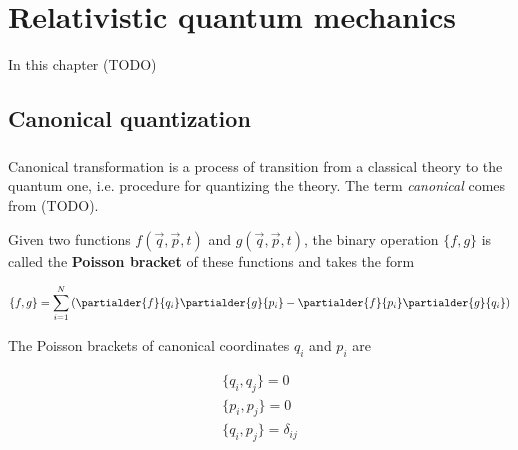\chapter{Relativistic quantum mechanics}

In this chapter (TODO)

\section{Canonical quantization}

\paragraph{} Canonical transformation is a process of transition from a classical theory to
the quantum one, i.e. procedure for quantizing the theory. The term \textit{canonical} comes
from (TODO).

\begin{definition}
    \label{df:poisson}
    Given two functions $f(\vec{q}, \vec{p}, t)$ and $g(\vec{q}, \vec{p}, t)$, the binary operation
    $\{f, g\}$ is called the \textbf{Poisson bracket} of these functions and takes the form

    \begin{equation}
        \{f, g\} = \sum_{i=1}^{N}\left(\partialder{f}{q_{i}} \partialder{g}{p_{i}} - \partialder{f}{p_{i}} \partialder{g}{q_{i}}\right)
    \end{equation}
\end{definition}

\begin{theorem}
    \label{th:poisson_cononical_coordinates}
    The Poisson brackets of canonical coordinates $q_{i}$ and $p_{i}$ are

    \begin{equation}
        \begin{gathered}
        \{q_{i}, q_{j}\} = 0 \\
        \{p_{i}, p_{j}\} = 0 \\
        \{q_{i}, p_{j}\} = \delta_{ij}
        \end{gathered}
    \end{equation}
\end{theorem}

